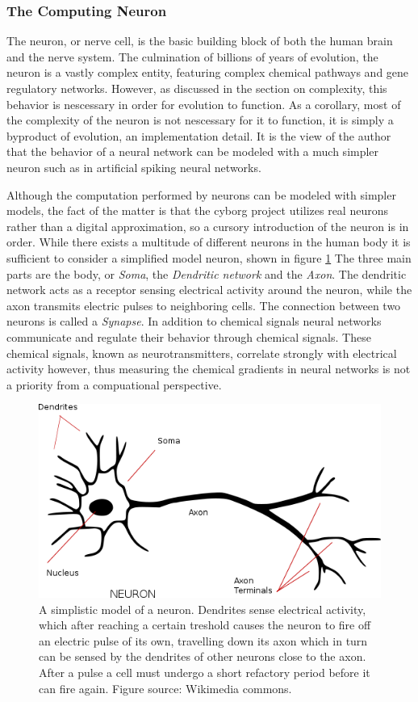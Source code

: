 \subsubsection{The Computing Neuron}
The neuron, or nerve cell, is the basic building block of both the human brain
and the nerve system.
The culmination of billions of years of evolution, the neuron is a vastly
complex entity, featuring complex chemical pathways and gene regulatory
networks.
However, as discussed in the section on complexity, this behavior is nescessary
in order for evolution to function.
As a corollary, most of the complexity of the neuron is not nescessary for it to
function, it is simply a byproduct of evolution, an implementation detail.
It is the view of the author that the behavior of a neural network can be
modeled with a much simpler neuron such as in artificial spiking neural
networks.\par
Although the computation performed by neurons can be modeled with simpler
models, the fact of the matter is that the cyborg project utilizes real neurons
rather than a digital approximation, so a cursory introduction of the neuron is
in order.
While there exists a multitude of different neurons in the human body it is
sufficient to consider a simplified model neuron, shown in figure \ref{figNeuron}
The three main parts are the body, or \emph{Soma}, the \emph{Dendritic
  network} and the \emph{Axon}. 
The dendritic network acts as a receptor sensing electrical activity around the
neuron, while the axon transmits electric pulses to neighboring cells.
The connection between two neurons is called a \emph{Synapse}.
%
In addition to chemical signals neural networks communicate and regulate their
behavior through chemical signals.
These chemical signals, known as neurotransmitters, correlate strongly with
electrical activity however, thus measuring the chemical gradients in neural
networks is not a priority from a compuational perspective.
\begin{figure}[h]
  \centering
  \includegraphics[width=1\textwidth]{fig/neuron.png}
  \caption{
    A simplistic model of a neuron.
    Dendrites sense electrical activity, which after reaching a certain
    treshold causes the neuron to fire off an electric pulse of its own,
    travelling down its axon which in turn can be sensed by the dendrites of
    other neurons close to the axon.
    After a pulse a cell must undergo a short refactory period before it can
    fire again.
    Figure source: Wikimedia commons.
  }
  \label{figNeuron}
\end{figure}
